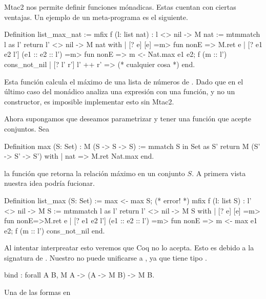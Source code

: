 Mtac2 nos permite definir funciones mónadicas. Estas cuentan con ciertas ventajas. Un ejemplo de un meta-programa es el siguiente.

\begin{coq}
Definition list_max_nat :=
  mfix f (l: list nat) : l <> nil -> M nat :=
    mtmmatch l as l' return l' <> nil -> M nat with
    | [? e] [e] =m> fun nonE => M.ret e
    | [? e1 e2 l'] (e1 :: e2 :: l') =m> fun nonE =>
      m <- Nat.max e1 e2;
      f (m :: l') cons_not_nil
    | [? l' r'] l' ++ r' => (* cualquier cosa *) 
    end.
\end{coq}

Esta función calcula el máximo de una lista de números de \nat. Dado que en el último caso del  monádico analiza una expresión
con una función, y no un constructor, es imposible implementar esto sin Mtac2.

Ahora supongamos que deseamos parametrizar \nat y tener una función que acepte conjuntos. Sea
\begin{coq}
Definition max (S: Set) : M (S -> S -> S) :=
  mmatch S in Set as S' return M (S' -> S' -> S') with
  | nat => M.ret Nat.max
  end.
\end{coq}

la función que retorna la relación máximo en un conjunto $S$. A primera vista nuestra idea podría fucionar.

\begin{coq}
Definition list_max (S: Set)  :=
  max <- max S; (* error! *)
  mfix f (l: list S) : l' <> nil -> M S :=
    mtmmatch l as l' return l' <> nil -> M S with
    | [? e] [e] =m> fun nonE=>M.ret e
    | [? e1 e2 l'] (e1 :: e2 :: l') =m> fun nonE =>
      m <- max e1 e2;
      f (m :: l') cons_not_nil
    end.
\end{coq}

Al intentar interpreatar esto veremos que Coq no lo acepta. Esto es debido a la signatura de . Nuestro  no puede
unificarse a , ya que tiene tipo .

\begin{coq}
bind : forall A B, M A -> (A -> M B) -> M B.
\end{coq}

Una de las formas en 